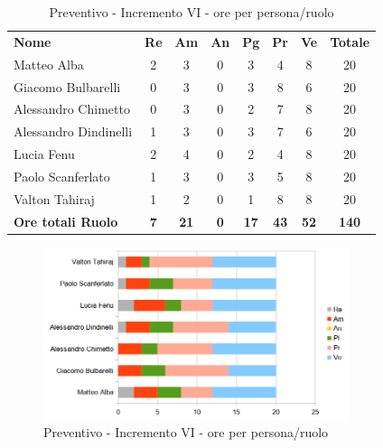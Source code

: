\begin{table} [h!]
	\begin{center}
		\begin{tabular} { m{3.5cm} c c c c c c c }
			\rowcolor{lightgray}
			\textbf{Nome} & \textbf{Re} & \textbf{Am} & \textbf{An} & \textbf{Pg} & \textbf{Pr} & \textbf{Ve} & \textbf{Totale} \\
			Matteo Alba & 2 & 3 & 0 & 3 & 4 & 8 & 20 \\
			Giacomo Bulbarelli & 0 & 3 & 0 & 3 & 8 & 6 & 20 \\
			Alessandro Chimetto & 0 & 3 & 0 & 2 & 7 & 8 & 20 \\
			Alessandro Dindinelli & 1 & 3 & 0 & 3 & 7 & 6 & 20 \\
			Lucia Fenu & 2 & 4 & 0 & 2 & 4 & 8 & 20 \\
			Paolo Scanferlato & 1 & 3 & 0 & 3 & 5 & 8 & 20 \\
			Valton Tahiraj & 1 & 2 & 0 & 1 & 8 & 8 & 20 \\
			\textbf{Ore totali Ruolo} & \textbf{7} & \textbf{21} & \textbf{0} & \textbf{17} & \textbf{43}& \textbf{52} & \textbf{140}
		\end{tabular}
		\caption{Preventivo - Incremento VI - ore per persona/ruolo}
	\end{center}
\end{table}
\begin{figure} [h!]
	\centering
	\includegraphics[width=0.8\textwidth]{res/img/grafici/preventivo-barre- incremento6.png}
	\caption{Preventivo - Incremento VI - ore per persona/ruolo} 
\end{figure}

\newpage
